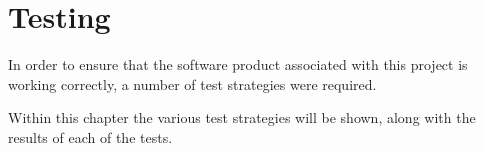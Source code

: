 \chapter{Testing}

In order to ensure that the software product associated with this project is 
working correctly, a number of test strategies were required. 

Within this chapter the various test strategies will be shown, along with the 
results of each of the tests.

\newpage


\newpage

